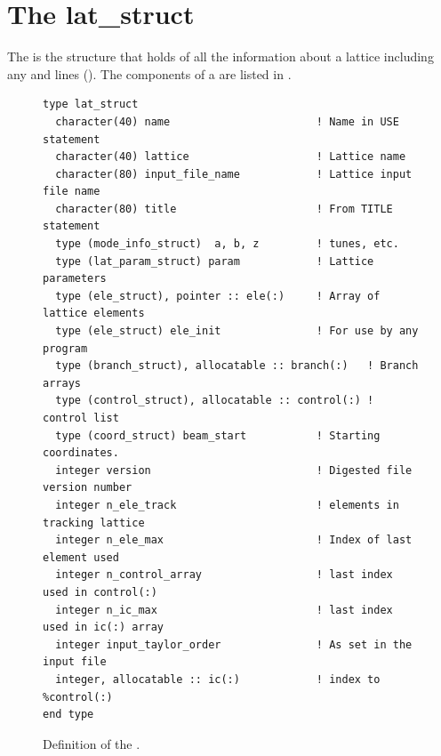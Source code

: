 \chapter{The lat_struct}
\label{c:lat.struct}

The  is the structure that holds of all the information
about a lattice including any  and  lines
(). The components of a  are listed in
.
\begin{figure}[htb]
\centering
\begin{verbatim}
type lat_struct
  character(40) name                       ! Name in USE statement
  character(40) lattice                    ! Lattice name
  character(80) input_file_name            ! Lattice input file name
  character(80) title                      ! From TITLE statement
  type (mode_info_struct)  a, b, z         ! tunes, etc.
  type (lat_param_struct) param            ! Lattice parameters
  type (ele_struct), pointer :: ele(:)     ! Array of lattice elements
  type (ele_struct) ele_init               ! For use by any program
  type (branch_struct), allocatable :: branch(:)   ! Branch arrays
  type (control_struct), allocatable :: control(:) ! control list
  type (coord_struct) beam_start           ! Starting coordinates.
  integer version                          ! Digested file version number
  integer n_ele_track                      ! elements in tracking lattice
  integer n_ele_max                        ! Index of last element used
  integer n_control_array                  ! last index used in control(:)
  integer n_ic_max                         ! last index used in ic(:) array
  integer input_taylor_order               ! As set in the input file
  integer, allocatable :: ic(:)            ! index to %control(:)
end type
\end{verbatim}
\caption{Definition of the .}
\label{f:lat.struct}
\end{figure}


